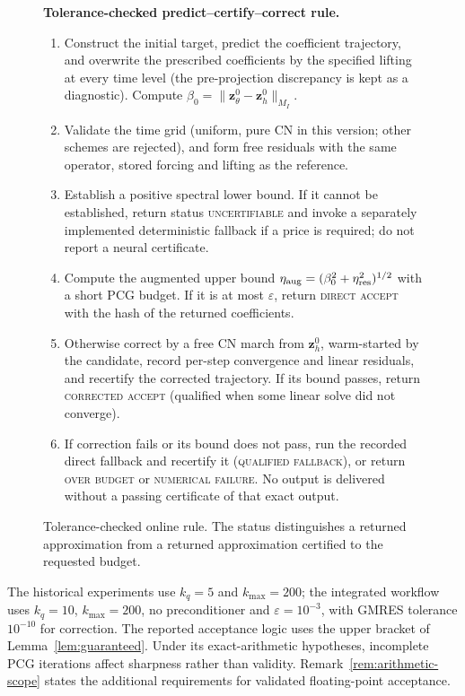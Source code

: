 \documentclass[11pt]{amsart}
\theoremstyle{remark}
\newcommand{\zz}{\mathbf z}
\begin{document}
\begin{figure}[ht]
\centering
\begin{minipage}{0.96\linewidth}
\textbf{Tolerance-checked predict--certify--correct rule.}
\begin{enumerate}[leftmargin=2em]
\item Construct the initial target, predict the coefficient trajectory, and
overwrite the prescribed coefficients by the specified lifting at every time
level (the pre-projection discrepancy is kept as a diagnostic). Compute
$\beta_0=\|\zz_\theta^0-\zz_h^0\|_{M_I}$.
\item Validate the time grid (uniform, pure CN in this version; other schemes
are rejected), and form free residuals with the same operator, stored forcing
and lifting as the reference.
\item Establish a positive spectral lower bound. If it cannot be
established, return status \textsc{uncertifiable} and invoke a separately implemented
deterministic fallback if a price is required; do not report a neural certificate.
\item Compute the augmented upper bound $\eta_{\rm aug}=(\beta_0^2+\eta_{\rm res}^2)^{1/2}$
with a short PCG budget. If it is at most $\varepsilon$, return
\textsc{direct accept} with the hash of the returned coefficients.
\item Otherwise correct by a free CN march from $\zz_h^0$, warm-started by the
candidate, record per-step convergence and linear residuals, and recertify the
corrected trajectory. If its bound passes, return \textsc{corrected accept}
(qualified when some linear solve did not converge).
\item If correction fails or its bound does not pass, run the recorded direct
fallback and recertify it (\textsc{qualified fallback}), or return
\textsc{over budget} or \textsc{numerical failure}. No output is delivered
without a passing certificate of that exact output.
\end{enumerate}
\end{minipage}
\caption{Tolerance-checked online rule. The status distinguishes a returned
approximation from a returned approximation certified to the requested budget.}
\label{alg:pcc}
\end{figure}

The historical experiments use $k_q=5$ and $k_{\max}=200$; the integrated
workflow uses $k_q=10$, $k_{\max}=200$, no preconditioner and
$\varepsilon=10^{-3}$, with GMRES tolerance $10^{-10}$ for correction.  The reported acceptance logic uses the upper bracket of
Lemma~\ref{lem:guaranteed}. Under its exact-arithmetic hypotheses,
incomplete PCG iterations affect sharpness rather than validity.
Remark~\ref{rem:arithmetic-scope} states the additional requirements for
validated floating-point acceptance.
\end{document}
